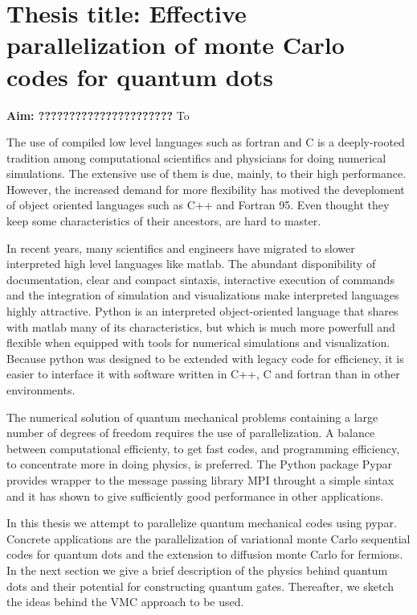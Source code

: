 \newcommand{\OP}[1]{{\bf\widehat{#1}}}

\newcommand{\be}{\begin{equation}}

\newcommand{\ee}{\end{equation}}



\pagestyle{plain}

\section*{Thesis title: Effective parallelization of monte Carlo codes for quantum dots}

{\bf Aim: ??????????????????????} To  


The use of compiled low level languages such as fortran and C is a deeply-rooted tradition among computational scientifics and physicians for doing numerical simulations. The extensive use of them is due, mainly, to their high performance. However, the increased demand for more flexibility has motived the deveploment of object oriented languages such as C++  and Fortran 95. Even thought they keep some characteristics of their ancestors, are hard to master. 

In recent years, many scientifics and engineers have migrated to slower interpreted high level languages like matlab. The abundant disponibility of documentation, clear and compact sintaxis, interactive execution of commands and the integration of simulation and visualizations make interpreted languages highly attractive. Python is an interpreted object-oriented language that shares with matlab many of its characteristics, but which is much more powerfull and flexible when equipped with tools for numerical simulations and visualization. Because python was designed to be extended with legacy code for efficiency, it is easier to interface it with  software written in C++, C and fortran than in other environments. 

The numerical solution of quantum mechanical problems containing a large number of degrees of freedom requires the use of parallelization. A balance between computational efficienty, to get fast codes, and programming efficiency, to concentrate more in doing physics, is preferred. The Python package Pypar provides wrapper to the message passing library MPI throught a simple sintax and it has shown to give sufficiently good performance in other applications.

In this thesis we attempt to parallelize quantum mechanical codes using pypar. Concrete applications are the parallelization of  variational monte Carlo sequential codes for quantum dots and the extension to diffusion monte Carlo for fermions. In the next section we give a brief description of the physics behind quantum dots and their potential for constructing quantum gates. Thereafter, we sketch the ideas behind the VMC approach to be used.


